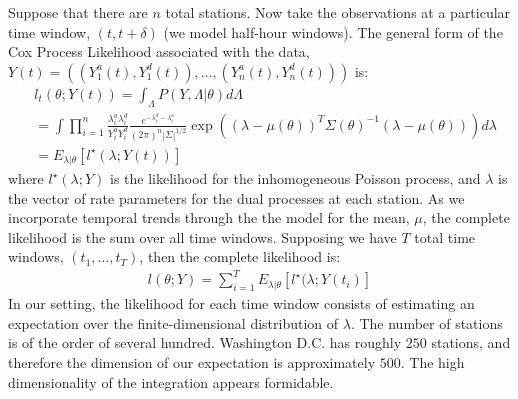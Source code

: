 \documentclass{acm_proc_article-sp}
\begin{document}
Suppose that there are $n$ total stations. Now take the observations at a particular time window, $(t , t+\delta)$ (we model half-hour windows).  The general form of the Cox Process Likelihood associated with the data, \\ $Y(t) = \left( (Y_1^{a} (t), Y_1^{d} (t)), \ldots, (Y_n^{a} (t), Y_n^{d} (t)) \right) $ is:
\begin{align*}
&l_t( \theta; Y(t) ) = \int_{\Lambda} P(Y,  \Lambda | \theta) d \Lambda \\
&= \int\prod_{i=1}^n \frac{\lambda_i^{a} \lambda_i^{d}}{Y_i^{a} Y_i^{d}} \frac{e^{-\lambda_i^{d}-\lambda_i^{a} }}{(2 \pi)^{n} |\Sigma|^{1/2}} \exp \left( (\lambda - \mu (\theta) )^T \Sigma (\theta) ^{-1} (\lambda - \mu (\theta) ) \right) d \lambda \\
&= E_{\lambda | \theta} [l^{\star} ( \lambda; Y(t))]
\end{align*}
\noindent where $l^{\star} ( \lambda; Y)$ is the likelihood for the inhomogeneous Poisson process, and $\lambda$ is the vector of rate parameters for the dual processes at each station.  As we incorporate temporal trends through the the model for the mean, $\mu$, the complete likelihood is the sum over all time windows.  Supposing we have $T$ total time windows, $(t_1, \ldots, t_T)$, then the complete likelihood is:
\begin{align*}
l ( \theta; Y ) = \sum_{i=1}^T  E_{\lambda | \theta} [l^{\star} ( \lambda; Y (t_i)]
\end{align*}
In our setting, the likelihood for each time window consists of estimating an expectation over the finite-dimensional distribution of $\lambda$.  The number of stations is of the order of several hundred.  Washington D.C. has roughly $250$ stations, and therefore the dimension of our expectation is approximately $500$.  The high dimensionality of the integration appears formidable. 
\end{document}
